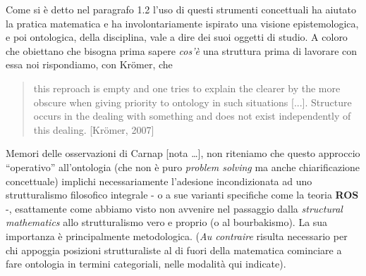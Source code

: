 	
	Come si è detto nel paragrafo 1.2 l'uso di questi strumenti concettuali ha aiutato la pratica matematica e ha involontariamente ispirato una visione epistemologica, e poi ontologica, della disciplina, vale a dire dei suoi oggetti di studio. A coloro che obiettano che bisogna prima sapere \textit{cos'è} una struttura prima di lavorare con essa noi rispondiamo, con Kr\"omer, che
	\begin{quotation}
		this reproach is empty and one tries to explain the clearer by the more obscure when giving priority to ontology in such situations [...]. Structure occurs in the dealing with something and does
		not exist independently of this dealing. [Kr\"omer, 2007]
	\end{quotation}
	
	
	
	Memori delle osservazioni di Carnap [nota \dots], non riteniamo che questo approccio ``operativo'' all'ontologia (che non è puro \textit{problem solving} ma anche chiarificazione concettuale) implichi necessariamente l'adesione incondizionata ad uno strutturalismo filosofico integrale - o a sue varianti specifiche come la teoria \textbf{ROS} -, esattamente come abbiamo visto non avvenire nel passaggio dalla \textit{structural mathematics} allo strutturalismo vero e proprio (o al bourbakismo). La sua importanza è principalmente metodologica. (\textit{Au contraire} risulta necessario per chi appoggia posizioni strutturaliste al di fuori della matematica cominciare a fare ontologia in termini categoriali, nelle modalità qui indicate). 